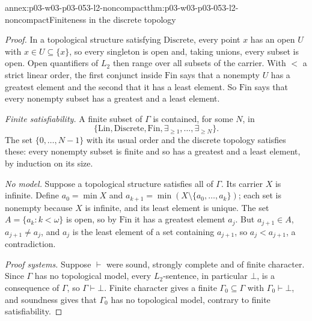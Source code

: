\begin{annexitem}{annex:p03-w03-p03-053-l2-noncompact}{thm:p03-w03-p03-053-l2-noncompact}{Finiteness in the discrete topology}
\begin{proof}
In a topological structure satisfying \(\mathrm{Discrete}\), every point
\(x\) has an open \(U\) with \(x\in U\subseteq\{x\}\), so every singleton
is open and, taking unions, every subset is open. Open quantifiers of
\(L_2\) then range over all subsets of the carrier. With \(<\) a strict
linear order, the first conjunct inside \(\mathrm{Fin}\) says that a
nonempty \(U\) has a greatest element and the second that it has a least
element. So \(\mathrm{Fin}\) says that every nonempty subset has a greatest
and a least element.

\emph{Finite satisfiability.} A finite subset of \(\Gamma\) is contained,
for some \(N\), in
\[
 \{\mathrm{Lin},\mathrm{Discrete},\mathrm{Fin},
   \exists_{\ge1},\ldots,\exists_{\ge N}\}.
\] The set
\(\{0,\ldots,N-1\}\) with its usual order and the discrete topology
satisfies these: every nonempty subset is finite and so has a greatest
and a least element, by induction on its size.

\emph{No model.} Suppose a topological structure satisfies all of
\(\Gamma\). Its carrier \(X\) is infinite. Define
\(a_0=\min X\) and \(a_{k+1}=\min(X\setminus\{a_0,\ldots,a_k\})\); each
set is nonempty because \(X\) is infinite, and its least element is unique.
The set \(A=\{a_k:k<\omega\}\) is open, so by \(\mathrm{Fin}\) it has a
greatest element \(a_j\). But \(a_{j+1}\in A\), \(a_{j+1}\neq a_j\), and
\(a_j\) is the least element of a set containing \(a_{j+1}\), so
\(a_j<a_{j+1}\), a contradiction.

\emph{Proof systems.} Suppose \(\vdash\) were sound, strongly complete and
of finite character. Since \(\Gamma\) has no topological model, every
\(L_2\)-sentence, in particular \(\bot\), is a consequence of \(\Gamma\),
so \(\Gamma\vdash\bot\). Finite character gives a finite
\(\Gamma_0\subseteq\Gamma\) with \(\Gamma_0\vdash\bot\), and soundness
gives that \(\Gamma_0\) has no topological model, contrary to finite
satisfiability.
\end{proof}
\end{annexitem}


